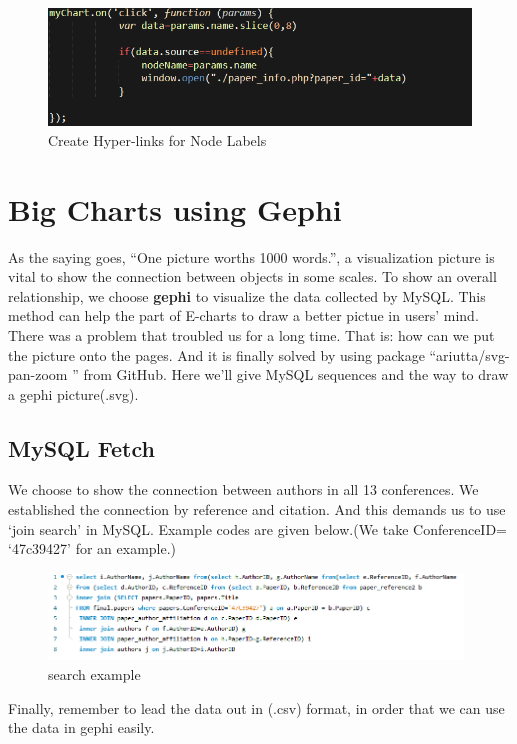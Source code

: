 \documentclass{book}
\begin{document}
\begin{figure}[H]
\centering
\includegraphics[scale=0.55]{img/zlt_rel_code_label.png}
\caption{Create Hyper-links for Node Labels}
\end{figure}


\section{Big Charts using Gephi}

As the saying goes, ``One picture worths 1000 words.'', a visualization picture is vital to show the connection between objects in some scales. To show an overall relationship, we choose  \textbf{gephi} to visualize the data collected by MySQL. This method can help the part of E-charts to draw a better pictue in users' mind. 
There was a problem that troubled us for a long time. That is: how can we put the picture onto the pages. And it is finally solved by using package ``ariutta/svg-pan-zoom
'' from GitHub. 
Here we'll give MySQL sequences and the way to draw a gephi picture(.svg).

\subsection{MySQL Fetch}

We choose to show the connection between authors in all 13 conferences. We established the connection by reference and citation. And this demands us to use `join search' in MySQL. Example codes are given below.(We take ConferenceID= `47c39427' for an example.)

\begin{figure}[H]
\centering
\includegraphics[width=11cm]{img/yhb_my_1.png}
\caption{search example}
\end{figure}

Finally, remember to lead the data out in (.csv) format, in order that we can use the data in gephi easily.
\end{document}
